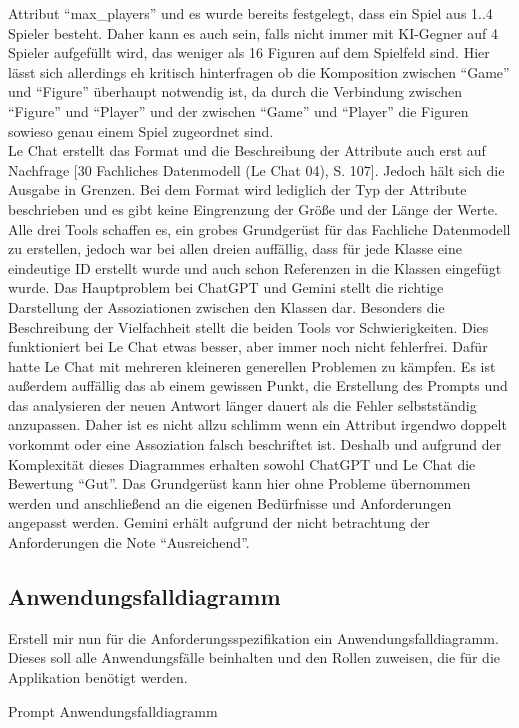 Attribut ``max\_players'' und es wurde bereits festgelegt, dass ein Spiel aus 1..4 Spieler besteht. Daher kann es auch sein, falls nicht immer mit KI-Gegner auf 4 Spieler aufgefüllt 
wird, das weniger als 16 Figuren auf dem Spielfeld sind. Hier lässt sich allerdings eh kritisch hinterfragen ob die Komposition zwischen ``Game'' und ``Figure'' überhaupt 
notwendig ist, da durch die Verbindung zwischen ``Figure'' und ``Player'' und der zwischen ``Game'' und ``Player'' die Figuren sowieso genau einem Spiel zugeordnet sind.\\
Le Chat erstellt das Format und die Beschreibung der Attribute auch erst auf Nachfrage [30 Fachliches Datenmodell (Le Chat 04), S. 107]. Jedoch hält sich die Ausgabe in Grenzen. Bei dem Format wird lediglich der Typ der
Attribute beschrieben und es gibt keine Eingrenzung der Größe und der Länge der Werte.\\

Alle drei Tools schaffen es, ein grobes Grundgerüst für das Fachliche Datenmodell zu erstellen, jedoch war bei allen dreien auffällig, dass für jede Klasse eine 
eindeutige ID erstellt wurde und auch schon Referenzen in die Klassen eingefügt wurde. Das Hauptproblem bei ChatGPT und Gemini stellt die richtige Darstellung der 
Assoziationen zwischen den Klassen dar. Besonders die Beschreibung der Vielfachheit stellt die beiden Tools vor Schwierigkeiten. Dies funktioniert bei Le Chat etwas besser, 
aber immer noch nicht fehlerfrei. Dafür hatte Le Chat mit mehreren kleineren generellen Problemen zu kämpfen. Es ist außerdem auffällig das ab einem gewissen 
Punkt, die Erstellung des Prompts und das analysieren der neuen Antwort länger dauert als die Fehler selbstständig anzupassen. Daher ist es nicht allzu schlimm 
wenn ein Attribut irgendwo doppelt vorkommt oder eine Assoziation falsch beschriftet ist. Deshalb und aufgrund der Komplexität dieses Diagrammes erhalten 
sowohl ChatGPT und Le Chat die Bewertung ``Gut''. Das Grundgerüst kann hier ohne Probleme übernommen werden und anschließend an die eigenen Bedürfnisse 
und Anforderungen angepasst werden. Gemini erhält aufgrund der nicht betrachtung der Anforderungen die Note ``Ausreichend''.


\subsection*{Anwendungsfalldiagramm}

\begin{prompt}[H]
    \begin{tcolorbox}[colback=gray!20, colframe=gray!20, boxrule=0pt, sharp corners] 
        Erstell mir nun für die Anforderungsspezifikation ein Anwendungsfalldiagramm. Dieses soll alle Anwendungsfälle beinhalten und den Rollen zuweisen, die für die 
        Applikation benötigt werden.
        \vfill
    \end{tcolorbox}
    \caption{Prompt Anwendungsfalldiagramm}
    \label{Prompt Anwendungsfalldiagramm}
\end{prompt}

